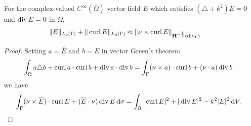 \begin{lmm}\label{lm:tt}
  For the complex-valued $C^{\infty}(\overline{\Omega})$ vector field $E$
  which satisfies $(\triangle+k^2)E=0$ and $\operatorname{div} E=0$ in $\Omega$,  
  \begin{align*}
    \|E\|_{L_2(\Gamma)} + \|\operatorname{curl} E\|_{L_2(\Gamma)} &\approx \|\nu\times\operatorname{curl} E\|_{{\bf H}^{-\frac{1}{2}}(\operatorname{div}_\Gamma)}
  \end{align*}
\end{lmm}
\begin{proof}
  Setting $a=\overline{E}$ and $b=E$ in vector Green's theorem 
  \begin{align*}
    \int_{\Omega}a\triangle b+\operatorname{curl} a\cdot\operatorname{curl} b+\operatorname{div} a\cdot\operatorname{div} b=\int_{\Gamma}(\nu\times a)\cdot\operatorname{curl} b+(\nu\cdot a)\operatorname{div} b
  \end{align*}
  we have
  \begin{align*}
    \int_{\Gamma}(\nu\times\overline{E})\cdot\operatorname{curl}{E}+(\overline{E}\cdot\nu)\operatorname{div} E\,\text{d}\sigma
    =\int_{\Omega}|\operatorname{curl} E|^2+|\operatorname{div} E|^2-k^2|E|^2\,\text{d}V.
  \end{align*}
  

\end{proof}
